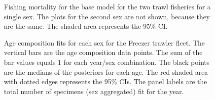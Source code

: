 \documentclass[11pt]{book}
\begin{document}
\begin{figure}[H]

{\centering {} 

}

\caption{Fishing mortality for the base model for the two trawl fisheries for a single sex. The plots for the second sex are not shown, because they are the same. The shaded area represents the 95\% CI.}\label{fig:fig-base-f}
\end{figure}








\clearpage




\begin{figure}[H]

{\centering {} 

}

\caption{Age composition fits for each sex for the Freezer trawler fleet. The vertical bars are the age composition data points. The sum of the bar values equals 1 for each year/sex combination. The black points are the medians of the posteriors for each age. The red shaded area with dotted edges represents the 95\% CIs. The panel labels are the total number of specimens (sex aggregated) fit for the year.}\label{fig:fig-base-age-fits-ft}
\end{figure}
\end{document}
